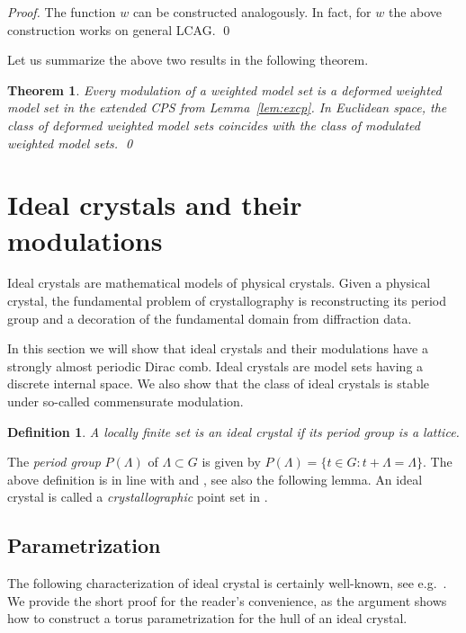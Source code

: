 \documentclass[11pt, a4wide]{amsart}
\newtheorem{theorem}[lemma]{Theorem}
\newtheorem{definition}[lemma]{Definition}
\numberwithin{lemma}{section}
\begin{document}
\begin{proof}
The function $w$ can be constructed analogously. In fact, for $w$ the above construction works on general LCAG.
\qed
\end{proof}


Let us summarize the above two results in the following theorem.

\begin{theorem}
Every modulation of a weighted model set is a deformed weighted model set in the extended CPS from Lemma~\ref{lem:excp}. In Euclidean space, the class of deformed weighted model sets coincides with the class of modulated weighted model sets. \qed
\end{theorem}

\section{Ideal crystals and their modulations}\label{The case of ideal crystals}

Ideal crystals are mathematical models of physical crystals. Given a physical crystal,  the fundamental problem of crystallography is reconstructing its period group and a decoration of the fundamental domain from diffraction data.

\medskip

In this section we will show that ideal crystals and their modulations have a strongly almost periodic Dirac comb. Ideal crystals are model sets having a discrete internal space. We also show that the class of ideal crystals is stable under so-called commensurate modulation.

\begin{definition}\label{def:idealcrystal}
A locally finite set is an \textit{ideal crystal} if its period group is a lattice.
\end{definition}

The \textit{period group} $P(\Lambda)$ of $\Lambda\subset G$ is given by $P(\Lambda)=\{t\in G: t+\Lambda=\Lambda\}$. The above definition is in line with \cite[Def.~5.1]{KL13} and \cite[Def.~1.3]{Lag}, see also the following lemma. An ideal crystal is called a \textit{crystallographic} point set in \cite[Def.~3.1]{BG2}.




\subsection{Parametrization}\label{sub:para}




The following characterization of ideal crystal is certainly well-known, see e.g.~\cite[Prop.~3.1]{BG2}. We provide the short proof for the reader's convenience, as the argument shows how to construct a torus parametrization for the hull of an ideal crystal.
\end{document}
